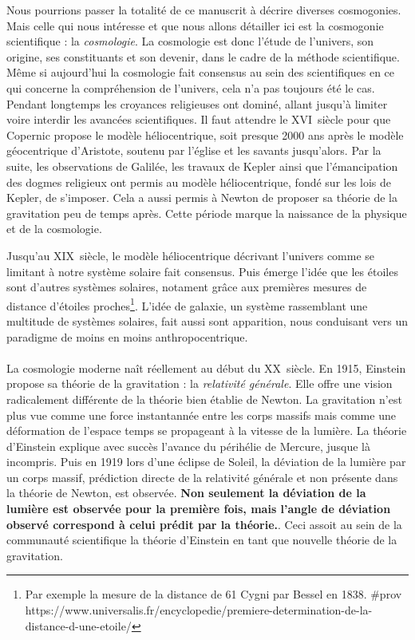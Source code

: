 \documentclass[11pt, twoside, a4paper, openright]{report}
\begin{document}
Nous pourrions passer la totalité de ce manuscrit à décrire diverses cosmogonies. Mais celle qui nous intéresse et que nous allons détailler ici est la cosmogonie scientifique : la \emph{cosmologie}. La cosmologie est donc l'étude de l'univers, son origine, ses constituants et son devenir, dans le cadre de la méthode scientifique. Même si aujourd'hui la cosmologie fait consensus au sein des scientifiques en ce qui concerne la compréhension de l'univers, cela n'a pas toujours été le cas. Pendant longtemps les croyances religieuses ont dominé, allant jusqu'à limiter voire interdir les avancées scientifiques.
Il faut attendre le \textsc{XVI}\ieme~siècle pour que Copernic propose le modèle héliocentrique, soit presque \num{2000} ans après le modèle géocentrique d'Aristote, soutenu par l'église et les savants jusqu'alors.
Par la suite, les observations de Galilée, les travaux de Kepler ainsi que l'émancipation des dogmes religieux ont permis au modèle héliocentrique, fondé sur les lois de Kepler, de s'imposer. Cela a aussi permis à Newton de proposer sa théorie de la gravitation peu de temps après. Cette période marque la naissance de la physique et de la cosmologie.

Jusqu'au \textsc{XIX}\ieme~siècle, le modèle héliocentrique décrivant l'univers comme se limitant à notre système solaire fait consensus. Puis émerge l'idée que les étoiles sont d'autres systèmes solaires, notament grâce aux premières mesures de distance d'étoiles proches\footnote{Par exemple la mesure de la distance de 61 Cygni par Bessel en 1838. \#prov https://www.universalis.fr/encyclopedie/premiere-determination-de-la-distance-d-une-etoile/}. L'idée de galaxie, un système rassemblant une multitude de systèmes solaires, fait aussi sont apparition, nous conduisant vers un paradigme de moins en moins anthropocentrique.

\paragraph{}
La cosmologie moderne naît réellement au début du \textsc{XX}\ieme~siècle. En 1915, Einstein propose sa théorie de la gravitation : la \emph{relativité générale}. Elle offre une vision radicalement différente de la théorie bien établie de Newton. La gravitation n'est plus vue comme une force instantannée entre les corps massifs mais comme une déformation de l'espace temps se propageant à la vitesse de la lumière. La théorie d'Einstein explique avec succès l'avance du périhélie de Mercure, jusque là incompris. Puis en 1919 lors d'une éclipse de Soleil, la déviation de la lumière par un corps massif, prédiction directe de la relativité générale et non présente dans la théorie de Newton, est observée. \textbf{Non seulement la déviation de la lumière est observée pour la première fois, mais l'angle de déviation observé correspond à celui prédit par la théorie.}. Ceci assoit au sein de la communauté scientifique la théorie d'Einstein en tant que nouvelle théorie de la gravitation.
\end{document}
